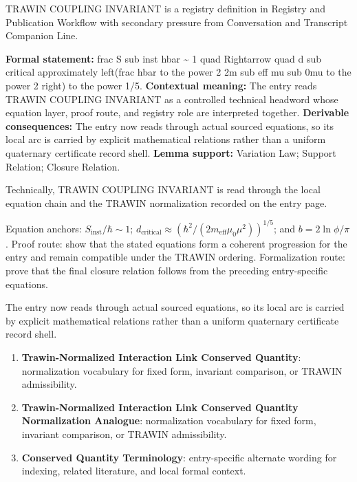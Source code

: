 
\begingroup\small
{}
TRAWIN COUPLING INVARIANT is a registry definition in Registry and Publication Workflow with secondary pressure from Conversation and Transcript Companion Line.

\begingroup\footnotesize\setlength{\emergencystretch}{3em}\sloppy
\textbf{Formal statement:} frac S sub inst hbar \textasciitilde{} 1 quad Rightarrow quad d sub critical approximately left(frac hbar to the power 2 2m sub eff mu sub 0mu to the power 2 right) to the power 1/5. \textbf{Contextual meaning:} The entry reads TRAWIN COUPLING INVARIANT as a controlled technical headword whose equation layer, proof route, and registry role are interpreted together. \textbf{Derivable consequences:} The entry now reads through actual sourced equations, so its local arc is carried by explicit mathematical relations rather than a uniform quaternary certificate record shell. \textbf{Lemma support:} Variation Law; Support Relation; Closure Relation.\par
\endgroup

Technically, TRAWIN COUPLING INVARIANT is read through the local equation chain and the TRAWIN normalization recorded on the entry page.

Equation anchors: \(S_{\mathrm{inst}}/\hbar\sim 1\); \(d_{\mathrm{critical}}\approx(\hbar^2/(2m_{\mathrm{eff}}\mu_0\mu^2))^{1/5}\); and \(b=2\ln\phi/\pi\). Proof route: show that the stated equations form a coherent progression for the entry and remain compatible under the TRAWIN ordering. Formalization route: prove that the final closure relation follows from the preceding entry-specific equations.

The entry now reads through actual sourced equations, so its local arc is carried by explicit mathematical relations rather than a uniform quaternary certificate record shell.
\endgroup

\begin{enumerate}[leftmargin=1.6em,itemsep=6pt,topsep=4pt]
\item \textbf{Trawin-Normalized Interaction Link Conserved Quantity}: normalization vocabulary for fixed form, invariant comparison, or TRAWIN admissibility.
\item \textbf{Trawin-Normalized Interaction Link Conserved Quantity Normalization Analogue}: normalization vocabulary for fixed form, invariant comparison, or TRAWIN admissibility.
\item \textbf{Conserved Quantity Terminology}: entry-specific alternate wording for indexing, related literature, and local formal context.
\end{enumerate}

